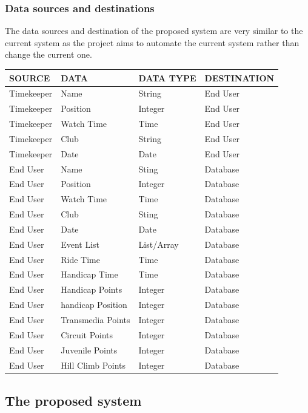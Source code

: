 \subsubsection{Data sources and destinations}
The data sources and destination of the proposed system are very similar to the current system as the project aims to automate the current system rather than change the current one.

\begin{tabular}{|l|l|l|l|}
\hline
SOURCE & DATA & DATA TYPE & DESTINATION  \\ \hline
Timekeeper & Name & String & End User  \\ \hline
Timekeeper & Position & Integer & End User  \\ \hline
Timekeeper & Watch Time & Time & End User  \\ \hline
Timekeeper & Club & String & End User  \\ \hline
Timekeeper & Date & Date& End User  \\ \hline
End User & Name & Sting & Database   \\ \hline
End User & Position & Integer & Database  \\ \hline
End User & Watch Time & Time & Database  \\ \hline
End User & Club & Sting & Database  \\ \hline
End User & Date & Date & Database  \\ \hline
End User & Event List & List/Array & Database  \\ \hline
End User & Ride Time & Time & Database  \\ \hline
End User & Handicap Time & Time & Database  \\ \hline
End User & Handicap Points & Integer & Database  \\ \hline
End User & handicap Position & Integer & Database  \\ \hline
End User & Transmedia Points & Integer & Database  \\ \hline
End User & Circuit Points & Integer & Database \\ \hline
End User & Juvenile Points & Integer & Database  \\ \hline
End User & Hill Climb Points & Integer & Database  \\ \hline
\end{tabular}
\subsection{The proposed system}

